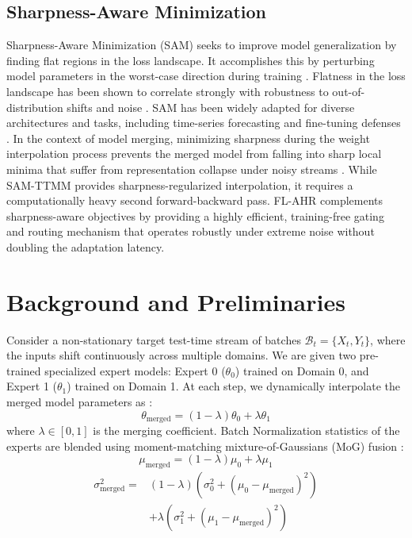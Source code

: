\documentclass{article}
\theoremstyle{plain}
\theoremstyle{definition}
\theoremstyle{remark}
\begin{document}
\subsection{Sharpness-Aware Minimization}
Sharpness-Aware Minimization (SAM) \cite{foret2020sharpnessaware} seeks to improve model generalization by finding flat regions in the loss landscape. It accomplishes this by perturbing model parameters in the worst-case direction during training \cite{karmanov2024efficient, li2022how}. Flatness in the loss landscape has been shown to correlate strongly with robustness to out-of-distribution shifts and noise \cite{moradi2023learning, kwon2021asam}. SAM has been widely adapted for diverse architectures and tasks, including time-series forecasting \cite{ilbert2024samformer, cheng2025whoever} and fine-tuning defenses \cite{wang2023identification}. In the context of model merging, minimizing sharpness during the weight interpolation process prevents the merged model from falling into sharp local minima that suffer from representation collapse under noisy streams \cite{oikonomou2025sharpnessaware, li2025focalsam}. While SAM-TTMM provides sharpness-regularized interpolation, it requires a computationally heavy second forward-backward pass. FL-AHR complements sharpness-aware objectives by providing a highly efficient, training-free gating and routing mechanism that operates robustly under extreme noise without doubling the adaptation latency.

\section{Background and Preliminaries}
\label{submission-background}

Consider a non-stationary target test-time stream of batches $\mathcal{B}_t = \{X_t, Y_t\}$, where the inputs shift continuously across multiple domains. We are given two pre-trained specialized expert models: Expert 0 ($\theta_0$) trained on Domain 0, and Expert 1 ($\theta_1$) trained on Domain 1. At each step, we dynamically interpolate the merged model parameters as \cite{imam2025t3, bertolissi2025local}:
\begin{equation}
  \theta_{\text{merged}} = (1 - \lambda) \theta_0 + \lambda \theta_1
\end{equation}
where $\lambda \in [0, 1]$ is the merging coefficient. Batch Normalization statistics of the experts are blended using moment-matching mixture-of-Gaussians (MoG) fusion \cite{calabourdin2025streaming, li2026adaptive}:
\begin{equation}
  \mu_{\text{merged}} = (1 - \lambda) \mu_0 + \lambda \mu_1
\end{equation}
\begin{equation}
\begin{split}
  \sigma^2_{\text{merged}} = {} & (1 - \lambda)(\sigma^2_0 + (\mu_0 - \mu_{\text{merged}})^2) \\
  & + \lambda(\sigma^2_1 + (\mu_1 - \mu_{\text{merged}})^2)
\end{split}
\end{equation}
\end{document}
